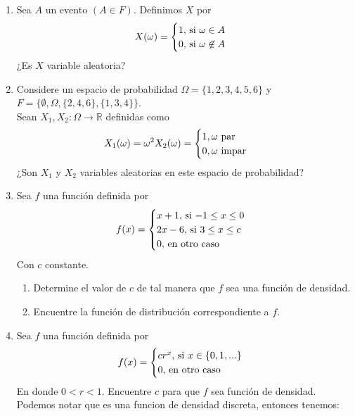 \documentclass[12pt,a4paper]{report}
\begin{document}
	\begin{enumerate}
		\item {
			Sea $A$ un evento $(A \in F)$. Definimos $X$ por
			\[
				X(\omega) =
				\begin{cases}
					1, $ si $\omega \in A\\
					0, $ si $\omega \not\in A
				\end{cases}
			\]
			¿Es $X$ variable aleatoria?
		}
		\item {
			Considere un espacio de probabilidad $\Omega = \{1, 2, 3, 4, 5, 6\}$ y
			$F = \{\emptyset, \Omega, \{2, 4, 6\}, \{1, 3, 4\}\}$.\\
			Sean $X_1, X_2 : \Omega \rightarrow \mathbb{R}$ definidas como
			\begin{align*}
				X_1(\omega) = \omega^2 & X_2(\omega) = \begin{cases}
																								1, \omega $ par$\\
																								0, \omega $ impar$
																							\end{cases}
			\end{align*}
			¿Son $X_1$ y $X_2$ variables aleatorias en este espacio de probabilidad?
		}
		\item {
			Sea $f$ una función definida por
			\[
				f(x) = \begin{cases}
								x+1, $ si $ -1 \leq x \leq 0\\
								2x-6, $ si $ 3 \leq x \leq c\\
								0, $ en otro caso$
			\end{cases}
			\]
			Con $c$ constante.
			\begin{enumerate}
				\item {
					Determine el valor de $c$ de tal manera que $f$ sea una función de
					densidad.
				}
				\item {
					Encuentre la función de distribución correspondiente a $f$.
				}
			\end{enumerate}
		}
		\item {
			Sea $f$ una función definida por
			\[
				f(x) = \begin{cases}
								cr^x, $ si $ x \in \{0, 1, ...\}\\
								0, $ en otro caso$
							 \end{cases}
			\]
			En donde $0 < r < 1$. Encuentre $c$ para que $f$ sea función de densidad.\\
			Podemos notar que es una funcion de densidad discreta, entonces tenemos:
			\begin{center}

\end{center}}
\end{enumerate}
\end{document}
